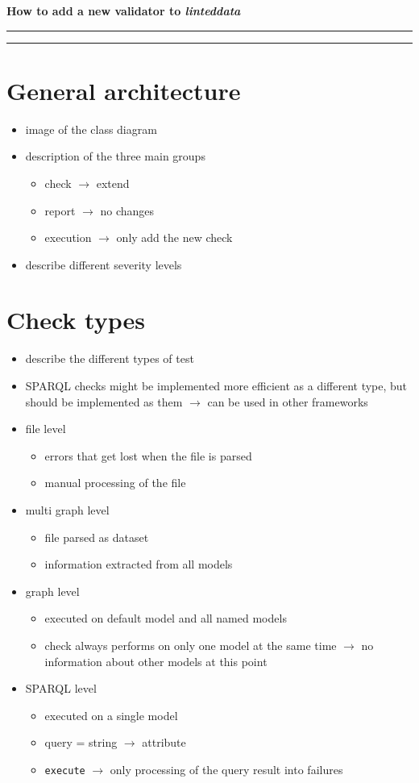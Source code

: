 \documentclass[12pt,a4paper]{article}
\newcommand{\function}[1]{\texttt{#1}}
\begin{document}
\begin{center}
\begin{LARGE}
\textbf{How to add a new validator to \textit{linteddata}}
\end{LARGE}
\end{center}
\hrule
\tableofcontents
\bigskip
\hrule
%
\section{General architecture}
\begin{itemize}
	\item image of the class diagram
	\item description of the three main groups
	\begin{itemize}
		\item check $\rightarrow$ extend
		\item report $\rightarrow$ no changes 
		\item execution $\rightarrow$ only add the new check
	\end{itemize}
	\item describe different severity levels
\end{itemize}
\section{Check types}
\begin{itemize}
	\item describe the different types of test
	\item SPARQL checks might be implemented more efficient as a different type, but should be implemented as them $\rightarrow$ can be used in other frameworks
	\item file level
	\begin{itemize}
		\item errors that get lost when the file is parsed
		\item manual processing of the file
	\end{itemize}	 
	\item multi graph level 
	\begin{itemize}
		\item file parsed as dataset
		\item information extracted from all models 
	\end{itemize}
	\item graph level 
	\begin{itemize}
		\item executed on default model and all named models
		\item check always performs on only one model at the same time $\rightarrow$ no information about other models at this point
	\end{itemize}
	\item SPARQL level
	\begin{itemize}
		\item executed on a single model 
		\item query = string $\rightarrow$ attribute
		\item \function{execute} $\rightarrow$ only processing of the query result into failures
	\end{itemize}		 
\end{itemize}
%
\end{document}
